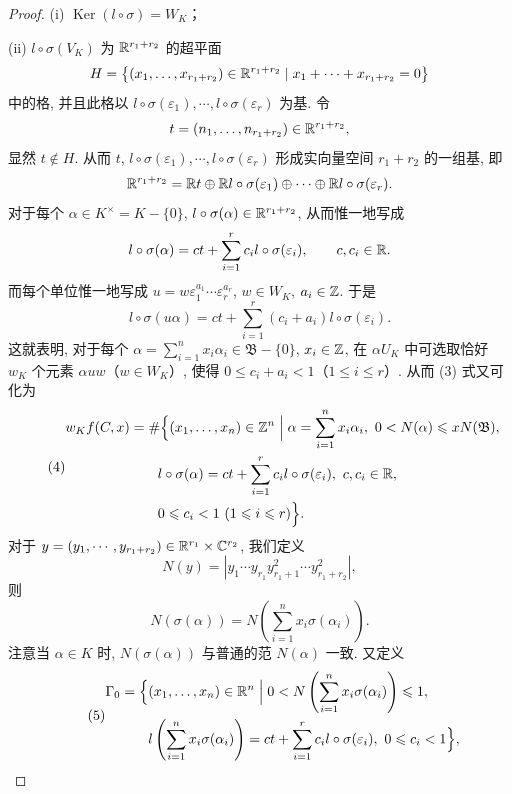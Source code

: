 \begin{proof}
(i) $\operatorname{Ker}(l\circ\sigma)=W_K$；

(ii) $l\circ\sigma(V_K)$ 为 $\mathbb{R}^{r_1+r_2}$ 的超平面
\[
  H=\left\{(x_1,\dots,x_{r_1+r_2})\in\mathbb{R}^{r_1+r_2}\mid x_1+\cdots+x_{r_1+r_2}=0\right\}
\]
中的格, 并且此格以 $l\circ\sigma(\varepsilon_1),\cdots,l\circ\sigma(\varepsilon_r)$ 为基. 令
\[
  t=(n_1,\dots,n_{r_1+r_2})\in\mathbb{R}^{r_1+r_2},
\]
显然 $t\notin H$. 从而 $t$, $l\circ\sigma(\varepsilon_1),\cdots,l\circ\sigma(\varepsilon_r)$ 形成实向量空间 $r_1+r_2$ 的一组基, 即
\[
  \mathbb{R}^{r_1+r_2}=\mathbb{R} t\oplus\mathbb{R} l\circ\sigma(\varepsilon_1)\oplus\cdots\oplus\mathbb{R} l\circ\sigma(\varepsilon_r).
\]
对于每个 $\alpha\in K^{\times}=K-\{0\}$, $l\circ\sigma(\alpha)\in\mathbb{R}^{r_1+r_2}$, 从而惟一地写成
\[
  l\circ\sigma(\alpha)=ct+\sum_{i=1}^{r}c_i l\circ\sigma(\varepsilon_i),\qquad c,c_i\in\mathbb{R}.
\]
而每个单位惟一地写成 $u=w\varepsilon_1^{a_1}\cdots\varepsilon_r^{a_r}$, $w\in W_K$, $a_i\in\mathbb{Z}$. 于是
\[
  l\circ\sigma(u\alpha)=ct+\sum_{i=1}^{r}(c_i+a_i)l\circ\sigma(\varepsilon_i).
\]
这就表明, 对于每个 $\alpha=\sum_{i=1}^{n}x_i\alpha_i\in\mathfrak{B}-\{0\}$, $x_i\in\mathbb{Z}$, 在 $\alpha U_K$ 中可选取恰好 $w_K$ 个元素 $\alpha uw$（$w\in W_K$）, 使得 $0\leqslant c_i+a_i<1$（$1\leqslant i\leqslant r$）. 从而 (3) 式又可化为
\begin{equation}\tag{4}
  \begin{aligned}
    w_Kf(C,x)&=\#\Big\{(x_1,\dots,x_n)\in\Z^n\;\Big|\;\alpha=\sum_{i=1}^{n}x_i\alpha_i,\ 0<N(\alpha)\leqslant xN(\mathfrak{B}),\\
    &\qquad l\circ\sigma(\alpha)=ct+\sum_{i=1}^{r}c_i l\circ\sigma(\varepsilon_i),\ c,c_i\in\R,\\
    &\qquad 0\leqslant c_i<1\ (1\leqslant i\leqslant r)\Big\}.
  \end{aligned}
\end{equation}
对于 $y=(y_1,\cdots,y_{r_1+r_2})\in\mathbb{R}^{r_1}\times\mathbb{C}^{r_2}$, 我们定义
\[
  N(y)=\left|y_1\cdots y_{r_1}y_{r_1+1}^2\cdots y_{r_1+r_2}^2\right|,
\]
则
\[
  N(\sigma(\alpha))=N\left(\sum_{i=1}^{n}x_i\sigma(\alpha_i)\right).
\]
注意当 $\alpha\in K$ 时, $N(\sigma(\alpha))$ 与普通的范 $N(\alpha)$ 一致. 又定义
\begin{equation}\tag{5}
  \begin{aligned}
    \Gamma_0&=\Big\{(x_1,\dots,x_n)\in\R^n\;\Big|\;0<N\left(\sum_{i=1}^{n}x_i\sigma(\alpha_i)\right)\leqslant 1,\\
    &\qquad l\left(\sum_{i=1}^{n}x_i\sigma(\alpha_i)\right)=ct+\sum_{i=1}^{r}c_i l\circ\sigma(\varepsilon_i),\ 0\leqslant c_i<1\Big\},
  \end{aligned}

\end{equation}
\end{proof}
